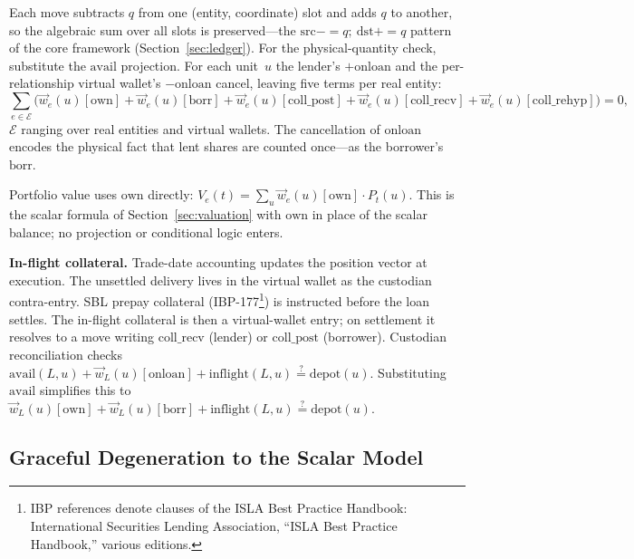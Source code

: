 \begin{proposition}
\label{prop:gpm-conservation}
Each move subtracts $q$ from one (entity, coordinate) slot and adds $q$ to another, so the algebraic sum over all slots is preserved---the $\mathrm{src}\mathbin{{-}{=}}q;\ \mathrm{dst}\mathbin{{+}{=}}q$ pattern of the core framework (Section~\ref{sec:ledger}). For the physical-quantity check, substitute the $\mathrm{avail}$ projection. For each unit~$u$ the lender's $+\mathrm{onloan}$ and the per-relationship virtual wallet's $-\mathrm{onloan}$ cancel, leaving five terms per real entity:
\[
\sum_{e \in \mathcal{E}} \bigl( \vec{w}_e(u)[\mathrm{own}] + \vec{w}_e(u)[\mathrm{borr}] + \vec{w}_e(u)[\mathrm{coll\_post}] + \vec{w}_e(u)[\mathrm{coll\_recv}] + \vec{w}_e(u)[\mathrm{coll\_rehyp}] \bigr) = 0,
\]
$\mathcal{E}$ ranging over real entities and virtual wallets. The cancellation of $\mathrm{onloan}$ encodes the physical fact that lent shares are counted once---as the borrower's $\mathrm{borr}$.
\end{proposition}

\noindent Portfolio value uses $\mathrm{own}$ directly: $V_e(t) = \sum_{u} \vec{w}_e(u)[\mathrm{own}]\cdot P_t(u)$. This is the scalar formula of Section~\ref{sec:valuation} with $\mathrm{own}$ in place of the scalar balance; no projection or conditional logic enters.

\noindent\textbf{In-flight collateral.} Trade-date accounting updates the position vector at execution. The unsettled delivery lives in the virtual wallet as the custodian contra-entry. SBL prepay collateral (IBP-177\footnote{IBP references denote clauses of the ISLA Best Practice Handbook: International Securities Lending Association, ``ISLA Best Practice Handbook,'' various editions.}) is instructed before the loan settles. The in-flight collateral is then a virtual-wallet entry; on settlement it resolves to a move writing $\mathrm{coll\_recv}$ (lender) or $\mathrm{coll\_post}$ (borrower). Custodian reconciliation checks $\mathrm{avail}(L,u) + \vec{w}_L(u)[\mathrm{onloan}] + \mathrm{inflight}(L,u) \stackrel{?}{=} \text{depot}(u)$. Substituting $\mathrm{avail}$ simplifies this to $\vec{w}_L(u)[\mathrm{own}] + \vec{w}_L(u)[\mathrm{borr}] + \mathrm{inflight}(L,u) \stackrel{?}{=} \text{depot}(u)$.

\subsection{Graceful Degeneration to the Scalar Model}
\label{sec:degeneration}

